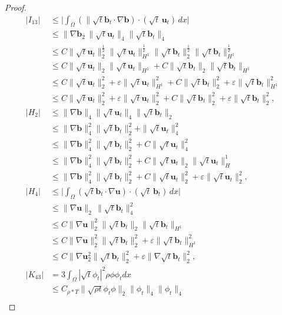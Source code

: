 \documentclass[11pt]{article}
\numberwithin{equation}{section}
\begin{document}
\begin{proof}
\begin{align*}
|I_{13}| &\leq \big|\int_{\Omega} ( \|\sqrt{t}\mathbf{b}_t \cdot\nabla\mathbf{b}) \cdot (\sqrt{t} \, \mathbf{u}_t) \, dx \big|\\& \leq  \|\nabla\mathbf{b}_2 \, \|\sqrt{t}\mathbf{u}_t\|_4\|\sqrt{t}\mathbf{b}_t\|_4\\
&\leq C\|\sqrt{t}\mathbf{u}_t\|_2^{\frac{1}{2}}\|\sqrt{t}\mathbf{u}_t\|_{H^1}^{\frac{1}{2}} \|\sqrt{t}\mathbf{b}_t\|_2^{\frac{1}{2}}\|\sqrt{t}\mathbf{b}_t\|_{H^1}^{\frac{1}{2}} \\ &\leq C\|\sqrt{t}\mathbf{u}_t\|_2\|\sqrt{t}\mathbf{u}_t\|_{H^1}
+C\|\sqrt{t}\mathbf{b}_t\|_2\|\sqrt{t}\mathbf{b}_t\|_{H^1}\\
&\leq C\|\sqrt{t}\mathbf{u}_t\|_2^2+\varepsilon\|\sqrt{t}\mathbf{u}_t\|_{H^1}^2
+C\|\sqrt{t}\mathbf{b}_t\|_2^2+\varepsilon\|\sqrt{t}\mathbf{b}_t\|_{H^1}^2\\
&\leq C\|\sqrt{t}\mathbf{u}_t\|_2^2+\varepsilon\|\sqrt{t}\mathbf{u}_t\|_2^2
+C\|\sqrt{t}\mathbf{b}_t\|_2^2+\varepsilon\|\sqrt{t}\mathbf{b}_t\|_2^2,\\
|H_2 |&\leq \| \nabla \mathbf{b} \|_4 \| \sqrt{t} \mathbf{u}_t \|_4 \| \sqrt{t} \mathbf{b}_t \|_2\\&\leq \| \nabla \mathbf{b} \|_4^2\| \sqrt{t} \mathbf{b}_t \|_2^2+ \| \sqrt{t} \mathbf{u}_t \|_4^2\\
& \leq \| \nabla \mathbf{b} \|_4^2\| \sqrt{t}\mathbf{b}_t \|_2^2 + C \| \sqrt{t} \mathbf{u}_t \|_4^2\\&\leq\| \nabla \mathbf{b} \|_4^2\| \sqrt{t}\mathbf{b}_t \|_2^2 + C \| \sqrt{t} \mathbf{u}_t \|_2 \| \sqrt{t} \mathbf{u}_t \|_H^1\\
&\leq\| \nabla \mathbf{b} \|_4^2\| \sqrt{t}\mathbf{b}_t \|_2^2 + C \| \sqrt{t} \mathbf{u}_t \|_2^2+\varepsilon \| \sqrt{t} \mathbf{u}_t \|_2^2,\\
|H_4|&\leq \big|\int_{\Omega} ( \sqrt{t}\mathbf{b}_t \cdot\nabla\mathbf{u}) \cdot (\sqrt{t} \, \mathbf{b}_t) \, dx \big|\\& \leq  \|\nabla\mathbf{u}\|_2 \, \|\sqrt{t}\mathbf{b}_t\|_4^2
\\&\leq C \|\nabla\mathbf{u}\|_2^2\|\sqrt{t}\mathbf{b}_t\|_2\|\sqrt{t}\mathbf{b}_t\|_{H^1}\\
&\leq C \|\nabla\mathbf{u}\|_2^2\|\sqrt{t}\mathbf{b}_t\|_2^2
+\varepsilon\|\sqrt{t}\mathbf{b}_t\|_{H^1}^2
\\&\leq C\|\nabla\mathbf{u}_2^2\|\sqrt{t}\mathbf{b}_t\|_2^2
+\varepsilon\|\nabla\sqrt{t}\mathbf{b}_t\|_2^2,\\
|K_{43}|&=3\int_{\Omega}|\sqrt{t}\phi_t|^2\rho\phi\phi_t dx
\\&\leq C_{\rho*T}\|\sqrt{\rho t}\phi_t\phi\|_2\|\phi_t\|_4\|\phi_t\|_4\\

\end{align*}
\end{proof}
\end{document}
